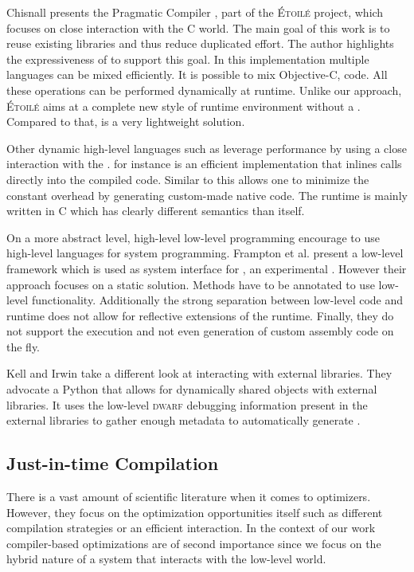 Chisnall presents the Pragmatic \ST Compiler \cite{Chis12a}, part of the \textsc{Étoilé} project, which focuses on close interaction with the C world.
The main goal of this work is to reuse existing libraries and thus reduce duplicated effort.
The author highlights the expressiveness of \ST to support this goal.
In this \ST implementation multiple languages can be mixed efficiently.
It is possible to mix Objective-C, \ST code.
All these operations can be performed dynamically at runtime.
Unlike our approach, \textsc{Étoilé} aims at a complete new style of runtime environment without a \VM.
Compared to that, \NB is a very lightweight solution.

Other dynamic high-level languages such as \Lua leverage \FFI performance by using a close interaction with the \JIT.
 for instance is an efficient \Lua implementation that inlines \FFI calls directly into the \JIT compiled code.
Similar to \NB this allows one to minimize the constant overhead by generating custom-made native code.
The \LuaJIT runtime is mainly written in C which has clearly different semantics than \Lua itself.

On a more abstract level, high-level low-level programming \cite{Fram09a} encourage to use high-level languages for system programming.
Frampton et al. present a low-level framework  which is used as system interface for \Jikes, an experimental \Java \VM.
However their approach focuses on a static solution.
Methods have to be annotated to use low-level functionality.
Additionally the strong separation between low-level code and runtime does not allow for reflective extensions of the runtime.
Finally, they do not support the execution and not even generation of custom assembly code on the fly.

Kell and Irwin \cite{Kell11a} take a different look at interacting with external libraries.
They advocate a Python \VM that allows for dynamically shared objects with external libraries.
It uses the low-level \textsc{dwarf} debugging information present in the external libraries to gather enough metadata to automatically generate \FFIs.


\subsection{Just-in-time Compilation}
There is a vast amount of scientific literature when it comes to \JIT optimizers.
However, they focus on the optimization opportunities itself such as different compilation strategies or an efficient \GC interaction.
In the context of our work compiler-based optimizations are of second importance since we focus on the hybrid nature of a system that interacts with the low-level \VM world.

